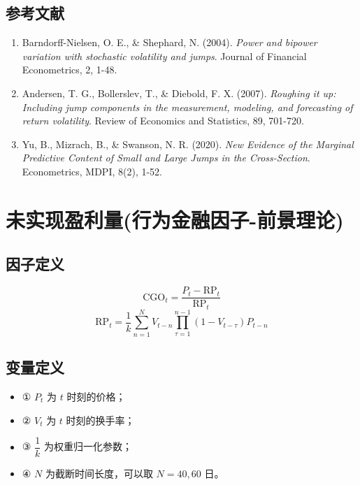 \documentclass{article}
\begin{document}
\subsection{参考文献}
\begin{enumerate}
    \item Barndorff-Nielsen, O. E., \& Shephard, N. (2004). \textit{Power and bipower variation with stochastic volatility and jumps}. Journal of Financial Econometrics, 2, 1-48.
    \item Andersen, T. G., Bollerslev, T., \& Diebold, F. X. (2007). \textit{Roughing it up: Including jump components in the measurement, modeling, and forecasting of return volatility}. Review of Economics and Statistics, 89, 701-720.
    \item Yu, B., Mizrach, B., \& Swanson, N. R. (2020). \textit{New Evidence of the Marginal Predictive Content of Small and Large Jumps in the Cross-Section}. Econometrics, MDPI, 8(2), 1-52.
\end{enumerate}

\section{未实现盈利量(行为金融因子-前景理论)}

\subsection{因子定义}

\begin{equation}
    \mathrm{CGO}_t = \frac{P_t - \mathrm{RP}_t}{\mathrm{RP}_t}
\end{equation}
\begin{equation}
    \mathrm{RP}_t = \frac{1}{k} \sum_{n=1}^{N} V_{t-n} \prod_{\tau=1}^{n-1} (1 - V_{t-\tau}) P_{t-n}
\end{equation}

\subsection{变量定义}
\begin{itemize}
    \item ① \( P_t \) 为 \( t \) 时刻的价格；
    \item ② \( V_t \) 为 \( t \) 时刻的换手率；
    \item ③ \( \dfrac{1}{k} \) 为权重归一化参数；
    \item ④ \( N \) 为截断时间长度，可以取 \( N=40, 60 \) 日。
\end{itemize}
\end{document}
